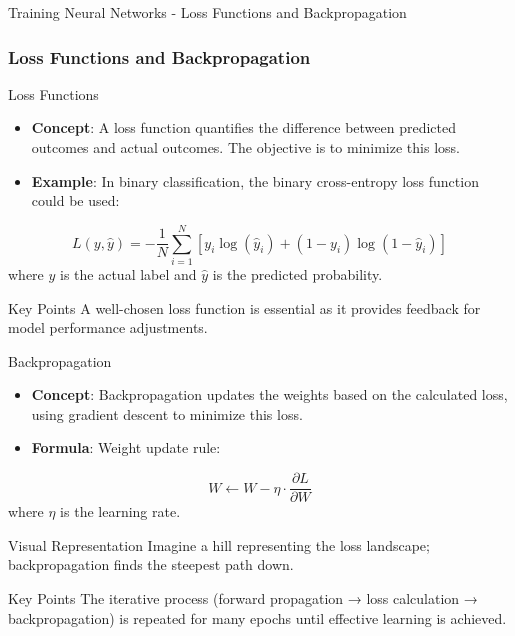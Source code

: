 \documentclass[aspectratio=169]{beamer}
\begin{document}
\begin{frame}[fragile]{Training Neural Networks - Loss Functions and Backpropagation}
    \frametitle{Loss Functions and Backpropagation}
    
    \begin{block}{Loss Functions}
        \begin{itemize}
            \item \textbf{Concept}: A loss function quantifies the difference between predicted outcomes and actual outcomes. The objective is to minimize this loss.
            \item \textbf{Example}: In binary classification, the binary cross-entropy loss function could be used:
        \end{itemize}

        \begin{equation}
            L(y, \hat{y}) = -\frac{1}{N} \sum_{i=1}^{N} \left[ y_i \log(\hat{y}_i) + (1 - y_i) \log(1 - \hat{y}_i) \right]
        \end{equation}
        where $y$ is the actual label and $\hat{y}$ is the predicted probability.
    
        \begin{block}{Key Points}
            A well-chosen loss function is essential as it provides feedback for model performance adjustments.
        \end{block}
    \end{block}
    
    \begin{block}{Backpropagation}
        \begin{itemize}
            \item \textbf{Concept}: Backpropagation updates the weights based on the calculated loss, using gradient descent to minimize this loss.
            \item \textbf{Formula}: Weight update rule:
        \end{itemize}
        \begin{equation}
            W \gets W - \eta \cdot \frac{\partial L}{\partial W}
        \end{equation}
        where $\eta$ is the learning rate.

        \begin{block}{Visual Representation}
            Imagine a hill representing the loss landscape; backpropagation finds the steepest path down.
        \end{block}

        \begin{block}{Key Points}
            The iterative process (forward propagation → loss calculation → backpropagation) is repeated for many epochs until effective learning is achieved.
        \end{block}
    \end{block}
\end{frame}
\end{document}
